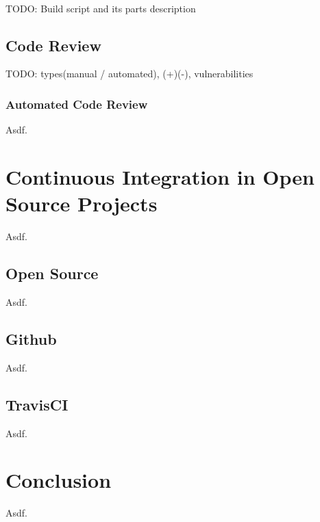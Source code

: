 \hfill\\
{\color{red}TODO: Build script and its parts description}

\section{Code Review}

{\color{red}TODO: types(manual / automated), (+)(-), vulnerabilities}

\subsection{Automated Code Review}

Asdf.

\chapter{Continuous Integration in Open Source Projects}

Asdf.

\section{Open Source}

Asdf.

\section{Github}

Asdf.

\section{TravisCI}

Asdf.

\chapter{Conclusion}

Asdf.
